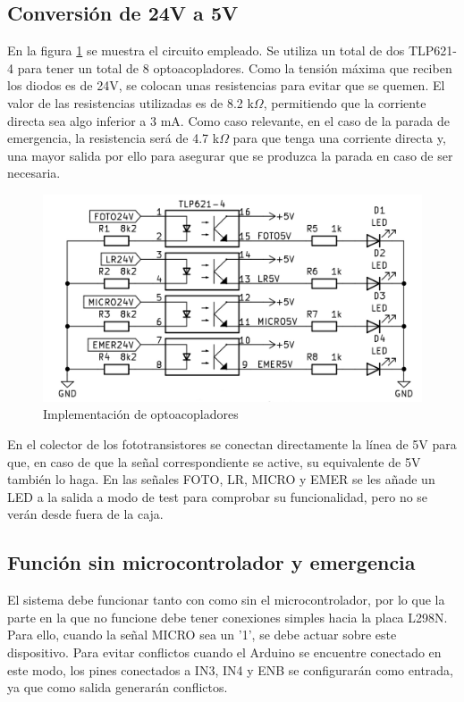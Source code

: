 \subsection{Conversión de 24V a 5V}

En la figura \ref{fig:figura34imp} se muestra el circuito empleado. Se utiliza un total de dos TLP621-4 para
tener un total de 8 optoacopladores. Como la tensión máxima que reciben los diodos es de 24V, se colocan
unas resistencias para evitar que se quemen. El valor de las resistencias utilizadas es de 8.2 k$\Omega$,
permitiendo que la corriente directa sea algo inferior a 3 mA. Como caso relevante, en el caso de la parada
de emergencia, la resistencia será de 4.7 k$\Omega$ para que tenga una corriente directa y, una mayor
salida por ello para asegurar que se produzca la parada en caso de ser necesaria.

\begin{figure}[hbtp]
    \centering
    \includegraphics[scale=1.25]{03-placa/03-optoacopladores.png}
    \caption{Implementación de optoacopladores}
    \label{fig:figura34imp}
    \end{figure}

En el colector de los fototransistores se conectan directamente la línea de 5V para que, en caso de que la
señal correspondiente se active, su equivalente de 5V también lo haga. En las señales FOTO, LR, MICRO y EMER
se les añade un LED a la salida a modo de test para comprobar su funcionalidad, pero no se verán desde fuera
de la caja.

\subsection{Función sin microcontrolador y emergencia}

El sistema debe funcionar tanto con como sin el microcontrolador, por lo que la parte en la que no funcione
debe tener conexiones simples hacia la placa L298N. Para ello, cuando la señal MICRO sea un '1', se debe 
actuar sobre este dispositivo. Para evitar conflictos cuando el Arduino se encuentre conectado en este modo,
los pines conectados a IN3, IN4 y ENB se configurarán como entrada, ya que como salida generarán conflictos.

